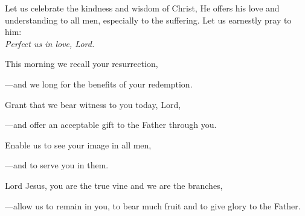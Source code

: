 \intercessions\indent

\begin{hangpar}

Let us celebrate the kindness and wisdom of Christ, He offers his love and understanding to all men, especially to the suffering. Let us earnestly pray to him:\\
\emph{Perfect us in love, Lord.}

\medskip This morning we recall your resurrection,

{\color{red}---\thinspace}and we long for the benefits of your redemption.

\medskip Grant that we bear witness to you today, Lord,

{\color{red}---\thinspace}and offer an acceptable gift to the Father through you.

\medskip Enable us to see your image in all men,

{\color{red}---\thinspace}and to serve you in them.

\medskip Lord Jesus, you are the true vine and we are the branches,

{\color{red}---\thinspace}allow us to remain in you, to bear much fruit and to give glory to the Father.

\end{hangpar}

